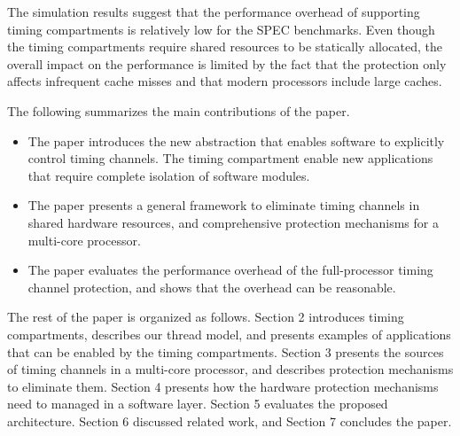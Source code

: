 The simulation results suggest that the performance overhead of supporting
timing compartments is relatively low for the SPEC benchmarks. Even though
the timing compartments require shared resources to be statically 
allocated, the overall impact on the performance is limited by the fact
that the protection only affects infrequent cache misses and that modern
processors include large caches. 

The following summarizes the main contributions of the paper.

\begin{itemize}
\item The paper introduces the new abstraction that enables software to
explicitly control timing channels. The timing compartment enable new
applications that require complete isolation of software modules.
\item The paper presents a general framework to eliminate timing channels
in shared hardware resources, and comprehensive protection mechanisms for
a multi-core processor.
\item The paper evaluates the performance overhead of the full-processor
timing channel protection, and shows that the overhead can be reasonable.
\end{itemize}

The rest of the paper is organized as follows.
Section 2 introduces timing compartments, describes our thread model, and 
presents examples of applications that can be enabled by the timing compartments.
Section 3 presents the sources of timing channels in a multi-core processor, and
describes protection mechanisms to eliminate them. 
Section 4 presents how the hardware protection mechanisms need to managed
in a software layer.
Section 5 evaluates the proposed architecture. Section 6 discussed related
work, and Section 7 concludes the paper.
